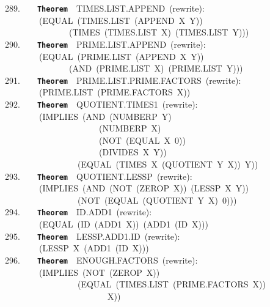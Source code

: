 \documentclass[11pt]{book}
\newenvironment{pubasis}{\begin{flushleft}\ttfamily\small}{\normalsize\rmfamily\end{flushleft}}
\newcommand{\axiomordefinition}[1]{\vspace{6pt}\texttt{\textbf{#1}}}
\begin{document}
\begin{pubasis}
289.~~~~\axiomordefinition{Theorem}~~TIMES.LIST.APPEND~(rewrite):\\
~~~~~~~~(EQUAL~(TIMES.LIST~(APPEND~X~Y))\\
~~~~~~~~~~~~~~~(TIMES~(TIMES.LIST~X)~(TIMES.LIST~Y)))\\

290.~~~~\axiomordefinition{Theorem}~~PRIME.LIST.APPEND~(rewrite):\\
~~~~~~~~(EQUAL~(PRIME.LIST~(APPEND~X~Y))\\
~~~~~~~~~~~~~~~(AND~(PRIME.LIST~X)~(PRIME.LIST~Y)))\\

291.~~~~\axiomordefinition{Theorem}~~PRIME.LIST.PRIME.FAC\-TORS~(rewrite):\\
~~~~~~~~(PRIME.LIST~(PRIME.FAC\-TORS~X))\\

292.~~~~\axiomordefinition{Theorem}~~QUOTIENT.TIMES1~(rewrite):\\
~~~~~~~~(IMPLIES~(AND~(NUMBERP~Y)\\
~~~~~~~~~~~~~~~~~~~~~~(NUMBERP~X)\\
~~~~~~~~~~~~~~~~~~~~~~(NOT~(EQUAL~X~0))\\
~~~~~~~~~~~~~~~~~~~~~~(DIVIDES~X~Y))\\
~~~~~~~~~~~~~~~~~(EQUAL~(TIMES~X~(QUOTIENT~Y~X))~Y))\\

293.~~~~\axiomordefinition{Theorem}~~QUOTIENT.LESSP~(rewrite):\\
~~~~~~~~(IMPLIES~(AND~(NOT~(ZEROP~X))~(LESSP~X~Y))\\
~~~~~~~~~~~~~~~~~(NOT~(EQUAL~(QUOTIENT~Y~X)~0)))\\

294.~~~~\axiomordefinition{Theorem}~~ID.ADD1~(rewrite):\\
~~~~~~~~(EQUAL~(ID~(ADD1~X))~(ADD1~(ID~X)))\\

295.~~~~\axiomordefinition{Theorem}~~LESSP.ADD1.ID~(rewrite):\\
~~~~~~~~(LESSP~X~(ADD1~(ID~X)))\\

296.~~~~\axiomordefinition{Theorem}~~ENOUGH.FAC\-TORS~(rewrite):\\
~~~~~~~~(IMPLIES~(NOT~(ZEROP~X))\\
~~~~~~~~~~~~~~~~~(EQUAL~(TIMES.LIST~(PRIME.FAC\-TORS~X))\\
~~~~~~~~~~~~~~~~~~~~~~~~X))\\


\end{pubasis}
\end{document}
